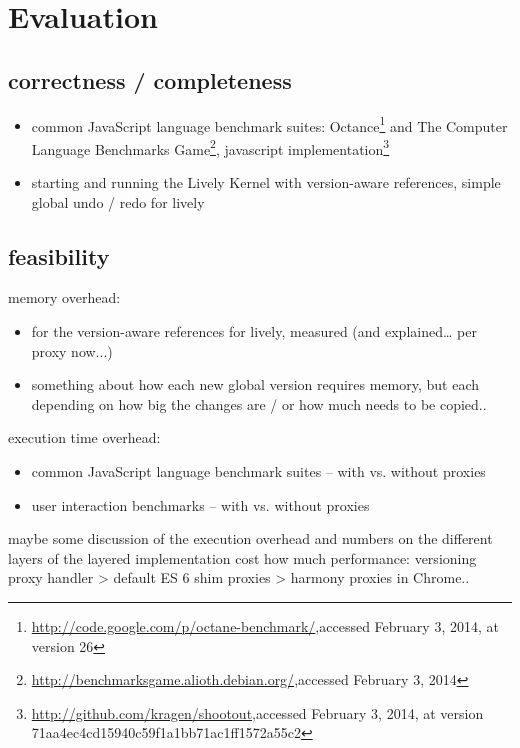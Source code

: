 \chapter{Evaluation} \label{sec:EVALUATION}

\section{correctness / completeness}

\begin{itemize}
    \item common JavaScript language benchmark suites: Octance\footnote{\url{http://code.google.com/p/octane-benchmark/},\goodbreak accessed February 3, 2014, at version 26} and The Computer Language Benchmarks Game\footnote{\url{http://benchmarksgame.alioth.debian.org/},\goodbreak accessed February 3, 2014}, javascript implementation\footnote{\url{http://github.com/kragen/shootout},\goodbreak accessed February 3, 2014, at version 71aa4ec4cd15940c59f1a1bb71ac1ff1572a55c2}
    \item starting and running the Lively Kernel with version-aware references, simple global undo / redo for lively
\end{itemize}



\section{feasibility}

memory overhead:
\begin{itemize}
    \item for the version-aware references for lively, measured (and explained… per proxy now...)
    \item something about how each new global version requires memory, but each depending on how big the changes are / or how much needs to be copied..
\end{itemize}


execution time overhead:
\begin{itemize}
    \item common JavaScript language benchmark suites – with vs. without proxies
    \item user interaction benchmarks – with vs. without proxies
\end{itemize}

maybe some discussion of the execution overhead and numbers on the different layers of the layered implementation cost how much performance: versioning proxy handler > default ES 6 shim proxies > harmony proxies in Chrome..